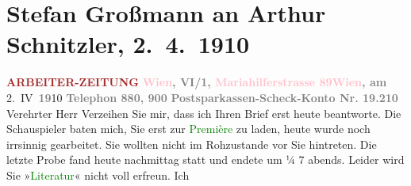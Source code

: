 

               \section[Stefan Großmann an Arthur Schnitzler, 2. 4. 1910]{ Stefan Großmann an Arthur Schnitzler, 2. 4. 1910}\nopagebreak{}\rehead{ }\normalsize\beginnumbering{} \toendnotes[C]{\smallbreak\pagebreak[2]} 
\toendnotes[C]{\smallbreak}\pstart
           \noindent{}{\pb}\textcolor{gray}{\textbf{\textcolor{brown}{ARBEITER-ZEITUNG}{}\ledrightnote{\textcolor{brown}{Arbeiter-Zeitung}}}}\pend
           \pstart
           \textcolor{gray}{\textbf{\textcolor{pink}{Wien}{}\ledrightnote{\textcolor{pink}{Wien}}, VI/1, \textcolor{pink}{Mariahilferstrasse 89}{}\ledrightnote{\textcolor{pink}{Mariahilferstraße}}}}\hfill \textcolor{gray}{\textbf{\textcolor{pink}{Wien}{}\ledrightnote{\textcolor{pink}{Wien}}, am}} 2. IV \textcolor{gray}{\textbf{19}}10\pend
           \pstart
           \textcolor{gray}{\textbf{Telephon 880, 900}}\pend
           \pstart
           \textcolor{gray}{\textbf{Postsparkassen-Scheck-Konto Nr. 19.210}}\pend
           \pstart\center{}Verehrter Herr\pend\pstart
           Verzeihen Sie  mir, dass ich Ihren Brief erst
               heute beantworte.\pend
           \pstart
           Die Schauspieler baten mich, Sie erst zur \textcolor{green}{Première}{} zu laden, heute wurde noch irrsinnig gearbeitet.
               Sie wollten nicht im Rohzustande vor Sie hintreten.\pend
           \pstart
           Die letzte Probe fand heute nachmittag statt und endete um ¼ 7
               abends.\pend
           \pstart
           Leider wird Sie »\textcolor{green}{Literatur}{}\ledrightnote{\textcolor{green}{Literatur}}« nicht voll erfreun. Ich

